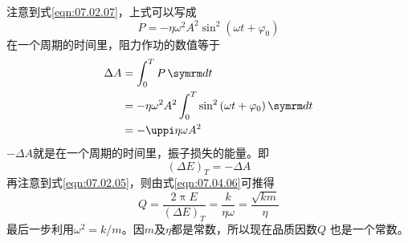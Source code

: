 \clearpage
注意到式\eqref{eqn:07.02.07}，上式可以写成
\begin{equation*}
    P = - \eta \omega ^ { 2 } A ^ { 2 } \sin ^ { 2 } \left( \omega t + \varphi _ { 0 } \right)
\end{equation*}
在一个周期的时间里，阻力作功的数值等于
\begin{equation}\label{eqn:07.04.06}
    \begin{aligned}
        \Delta A &= \int _ { 0 } ^ { T } P \dif t  \\
                &= - \eta \omega ^ { 2 } A ^ { 2 } \int _ { 0 } ^ { T } \sin ^ { 2 } \left( \omega t + \varphi _ { 0 } \right) \dif t  \\
                &= - \uppi \eta \omega A ^ { 2 }
    \end{aligned}
\end{equation}
$ - \Delta A $就是在一个周期的时间里，振子损失的能量。即
\begin{equation*}
     \left( \Delta E \right) _ { T } = - \Delta A
\end{equation*}
再注意到式\eqref{eqn:07.02.05}，则由式\eqref{eqn:07.04.06}可推得
\begin{equation}\label{eqn:07.04.07}
    Q = \frac { 2 \uppi E } { \left( \Delta E \right) _ { T } } = \frac { k } { \eta \omega } = \frac { \sqrt { k m } } { \eta }
\end{equation}
最后一步利用$  \omega ^ { 2 } = k / m   $。因$ m $及$ \eta $都是常数，所以现在品质因数$ Q $
也是一个常数。

